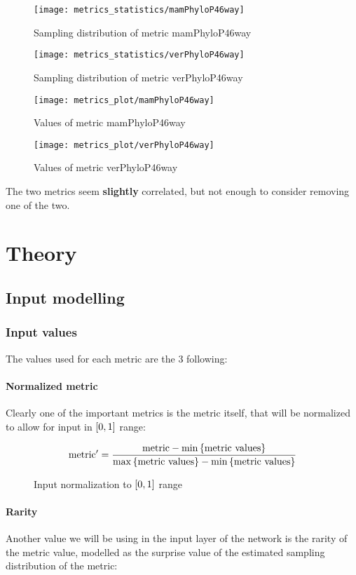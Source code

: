 \begin{figure}
	\texttt{[image: metrics\_statistics/mamPhyloP46way]}
	\caption{Sampling distribution of metric mamPhyloP46way}
\end{figure}
\begin{figure}
	\texttt{[image: metrics\_statistics/verPhyloP46way]}
	\caption{Sampling distribution of metric verPhyloP46way}
\end{figure}
\begin{figure}
	\texttt{[image: metrics\_plot/mamPhyloP46way]}
	\caption{Values of metric mamPhyloP46way}
\end{figure}
\begin{figure}
	\texttt{[image: metrics\_plot/verPhyloP46way]}
	\caption{Values of metric verPhyloP46way}
\end{figure}

The two metrics seem \textbf{slightly} correlated, but not enough to consider removing one of the two.

\part{Theory}
\chapter{Input modelling}

\section{Input values}
The values used for each metric are the 3 following:

\subsection{Normalized metric}
Clearly one of the important metrics is the metric itself, that will be normalized to allow for input in \(\left[0,1\right]\) range:

\begin{figure}
	\[
		\text{metric}' = \frac{\text{metric} - \min\left\{\text{metric values}\right\}}{\max\left\{\text{metric values}\right\}- \min\left\{\text{metric values}\right\}}
	\]
	\caption{Input normalization to \(\left[0,1\right]\) range}
\end{figure}

\subsection{Rarity}
Another value we will be using in the input layer of the network is the rarity of the metric value, modelled as the surprise value of the estimated sampling distribution of the metric:

